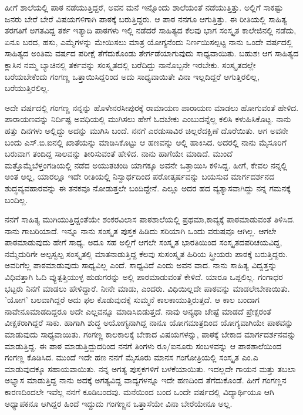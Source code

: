 {ಹೀಗೆ ಶಾಲೆಯಲ್ಲಿ ಪಾಠ ನಡೆಯುತ್ತಿದ್ದರೆ, ಅವನ ಮನೆ ಇನ್ನೊಂದು \hbox{ಶಾಲೆಯಂತೆ} ನಡೆಯುತ್ತಿತ್ತು. ಅಲ್ಲಿಗೆ ಸಾಕಷ್ಟು ಜನರು ಬೇರೆ ಬೇರೆ ವಿಷಯಗಳಿಗಾಗಿ ಪಾಠಕ್ಕೆ ಬರುತ್ತಿದ್ದರು. ಆ ಪಾಠ ನನಗೂ ಆಗುತ್ತಿತ್ತು.  ಈ ರೀತಿಯಲ್ಲಿ ಸಾಹಿತ್ಯ ತರಗತಿಗೆ  ಅಗತವಿದ್ದ ತರ್ಕ ಇತ್ಯಾದಿ ಪಾಠಗಳು ಇಲ್ಲಿ ನಡೆದರೆ ಸಾಹಿತ್ಯದ ಕೆಲವು ಭಾಗ ಸಂಸ್ಕೃತ ಕಾಲೇಜಿನಲ್ಲಿ  ನಡೆದು,  ಏನೂ ಬರದ, ಹಸು, ಎಮ್ಮೆಗಳನ್ನು ಮೇಯಿಸಲು ಮಾತ್ರ ಯೋಗ್ಯನೆಂದು ನಿರ್ಣಯಿಸಲ್ಪಟ್ಟ ನಾನು ಒಂದೇ ವರ್ಷದಲ್ಲಿ ಸಾಹಿತ್ಯದ ಅಂತಿಮ ವರ್ಷದ ಪರೀಕ್ಷೆ ತೆಗೆದುಕೊಂಡು ತೇರ್ಗಡೆಯಾಗುವುದು ಸಾಧ್ಯವಾಯಿತು. ಬಹುಶಃ ಆಗ ಸಾಹಿತ್ಯದ ಕ್ಲಾಸಿನ ನಮ್ಮ ಬ್ಯಾಚಿನಲ್ಲಿ ತರ್ಕವನ್ನು ಸಂಸ್ಕೃತದಲ್ಲಿ ಬರೆದಿದ್ದು ನಾನೊಬ್ಬನೇ ಇರಬೇಕು. ಸಂಸ್ಕೃತದಲ್ಲೇ ಬರೆಯಬೇಕೆಂದು ಗಂಗಣ್ಣ ಒತ್ತಾಯಿಸಿದ್ದರಿಂದ ಅದು ಸಾಧ್ಯವಾಯಿತೇ ವಿನಾ ಇಲ್ಲದಿದ್ದರೆ ಆಗುತ್ತಿರಲಿಲ್ಲ, ಬರೆಯುತ್ತಿರಲಿಲ್ಲ.

ಅದೇ ವರ್ಷದಲ್ಲಿ ಗಂಗಣ್ಣ ನನ್ನನ್ನು ಹೊಳೇನರಸೀಪುರಕ್ಕೆ ರಾಮಾಯಣ ಪಾರಾಯಣ ಮಾಡಲು ಹೋಗುವಂತೆ ಹೇಳಿದ. ಪಾರಾಯಣವನ್ನು ನಿರ್ದಿಷ್ಟ ಅವಧಿಯಲ್ಲಿ ಮುಗಿಸಲು ಹೇಗೆ ಓದಬೇಕು ಎಂಬುದನ್ನೆಲ್ಲ ಕಲಿಸಿ ಕಳುಹಿಸಿಕೊಟ್ಟ. ನಾನು ಹತ್ತು ದಿನಗಳು ಅಲ್ಲಿದ್ದು ಅದನ್ನು ಮುಗಿಸಿ ಬಂದೆ. ನನಗೆ ಎರಡುಸಾವಿರ ಚಿಲ್ಲರೆ\break ದಕ್ಷಿಣೆ ದೊರೆಯಿತು. ಆಗ ಅವನೇ ಬಂದು ಎಸ್.ಬಿ.ಐನಲ್ಲಿ ಖಾತೆಯನ್ನು ಮಾಡಿಸಿ\-ಕೊಟ್ಟು ಆ ಹಣವನ್ನು ಅಲ್ಲಿ ಹಾಕಿಸಿದ. ಅದರಲ್ಲಿ ನಾನು ಮೈಸೂರಿಗೆ ಬರುವಾಗ ತಂದಿದ್ದ ಸಾಲವನ್ನು ತೀರಿಸುವಂತೆ ಹೇಳಿದ. ನಾನು ಹಾಗೆಯೇ ಮಾಡಿದೆ. ಮುಂದೆ ಮತ್ತೊಮ್ಮೆ\break ಬೆಳ್ತಂಗಡಿಯಲ್ಲಿ ನಡೆದ ಅಯುತಚಂಡಿ ಯಾಗಕ್ಕೂ ಅವನೇ ಒತ್ತಾಯಿಸಿ ಕಳಿಸಿದ್ದ. ಹೀಗೆ, ಕೇವಲ ನನ್ನಲ್ಲಿ ಅಂತ ಅಲ್ಲ, ಯಾರಲ್ಲೂ ಇದೇ ರೀತಿಯಲ್ಲಿ ನಿಸ್ವಾರ್ಥದಿಂದ ಪರೋತ್ಕರ್ಷವನ್ನು ಬಯಸುವ ಮಾರ್ಗದರ್ಶನದ  ಶುದ್ಧವ್ಯವಹಾರವನ್ನು ಈ ತನಕವೂ ನೋಡುತ್ತಲೇ ಬಂದಿದ್ದೇನೆ. ಎಲ್ಲೂ ಅದರ ಹದ ವ್ಯತ್ಯಾಸವಾಗಿದ್ದು ನನ್ನ ಗಮನಕ್ಕೆ ಬಂದಿಲ್ಲ.

ನನಗೆ ಸಾಹಿತ್ಯ  ಮುಗಿಯುತ್ತಿದ್ದಂತೆಯೇ ಶಂಕರವಿಲಾಸ ಪಾಠಶಾಲೆಯಲ್ಲಿ ಪ್ರಥಮಾ,\break ಕಾವ್ಯಕ್ಕೆ ಪಾಠಮಾಡುವಂತೆ ತಿಳಿಸಿದ. ನಾನು ಗಾಬರಿಯಾದೆ. ಇನ್ನೂ ನಾನು ಸಂಸ್ಕೃತ ಪುಸ್ತಕ ಹಿಡಿದು ಸರಿಯಾಗಿ ಒಂದು ವರುಷವೂ ಆಗಿಲ್ಲ. ಆಗಲೇ ಪಾಠಮಾಡುವುದು ಹೇಗೆ ಸಾಧ್ಯ. ಅದೂ ಸಹ ಅಲ್ಲಿಗೆ ಆಗಲೇ ಸಂಸ್ಕೃತ ಭಾರತಿಯಿಂದ ಸಂಸ್ಕೃತದ\break ಪರಿಚಯವಿದ್ದ, ನಮ್ಮೆದುರಿಗೇ ಅಲ್ಪಸ್ವಲ್ಪ ಸಂಸ್ಕೃತಲ್ಲಿ ಮಾತನಾಡುತ್ತಿದ್ದ ಕೆಲವು \hbox{ಸುಸಂಸ್ಕೃತ} ಹಿರಿಯ ಸ್ತ್ರೀಯರು ಪಾಠಕ್ಕೆ ಬರುತ್ತಿದ್ದರು. ಅವರಿಗೆಲ್ಲ ಪಾಠಮಾಡುವುದು ಸಾಧ್ಯವಿಲ್ಲ ಎಂದೆ. ಸಾಧ್ಯವಿದೆ ಎಂದು ಅವನ ವಾದ. ನಾನು ಸಾಹಿತ್ಯ ವಿದ್ವತ್ತನ್ನು ವಿಧಿವತ್ತಾಗಿ ಓದಿ ವ್ಯುತ್ಪತ್ತಿಯುಳ್ಳ ಹುಡುಗರನ್ನು ಅಲ್ಲಿ ಪಾಠಮಾಡುವಂತೆ ಕೇಳಿದೆ. ಯಾರೂ ಒಪ್ಪಲಿಲ್ಲ. ಗಂಗಾಧರ ಭಟ್ಟರು ನಿನಗೆ ಮಾಡಲು ಹೇಳಿದ್ದಾರೆ. ನೀನೇ ಮಾಡು, ಎಂದರು. ವಿಧಿಯಿಲ್ಲದೇ ಪಾಠವನ್ನು ಮಾಡಲೇಬೇಕಾಯಿತು. 'ಯೋಗ' ಬಲವಾಗಿದ್ದರೆ ಅದು ಫಲ ಕೊಡುವುದಕ್ಕೆ ಸುಮ್ಮನೆ ಕಾಲಕಾಯುತ್ತಿರುತ್ತದೆ. ಆ ಕಾಲ ಬಂದಾಗ ನಾವೇನೂ\break ಮಾಡದಿದ್ದರೂ ಅದೇ ಎಲ್ಲವನ್ನೂ ಮಾಡಿಸಿಬಿಡುತ್ತದೆ. ನಾವು ಅನ್ಯಥಾ ಚೇಷ್ಟೆ ಮಾಡದೆ ಪ್ರೇಕ್ಷರಂತೆ ವೀಕ್ಷಕರಾಗಿದ್ದರೆ ಸಾಕು. ಹಾಗಾಗಿ ಶುದ್ಧ ಅಯೋಗ್ಯನಾಗಿದ್ದ ನಾನೂ ಯೋಗಮಾತ್ರದಿಂದ ಯೋಗ್ಯವಾಗಿಯೇ ಪಾಠವನ್ನು  ಮಾಡುವುದು ಸಾಧ್ಯವಾಯಿತು. ಗಂಗಣ್ಣ ಕಾಲಕಾಲಕ್ಕೆ ಬೇಕಾದ ವಿಷಯಗಳನ್ನು, ಪಾಠಕ್ಕೆ ಬೇಕಾದ ಮಾರ್ಗದರ್ಶನವನ್ನು ಮಾಡುತ್ತಿದ್ದ. ಈ ಪಾಠ ಮಾಡುತ್ತಿದ್ದುದರಿಂದ ನನಗೆ ತಿಂಗಳು ರೂ/ಐನೂರು  ಸಂಬಳವನ್ನು ಆ ಪಾಠಶಾಲೆಯಿಂದ ಗಂಗಣ್ಣ ಕೊಡಿಸಿದ. ಮುಂದೆ ಇದೇ ಹಣ ನನಗೆ ಮೈಸೂರು ಮಾನಸ ಗಂಗೋತ್ರಿಯಲ್ಲಿ  ಸಂಸ್ಕೃತ ಎಂ.ಎ ಮಾಡುವುದಕ್ಕೂ ಸಹಾಯವಾಯಿತು. ನನ್ನ ಅಗತ್ಯ ಪುಸ್ತಕಗಳಿಗೆ ಬಳಕೆಯಾಯಿತು. ಇದಲ್ಲದೇ ಗಾಯನ ಮತ್ತು ತಬಲಾ ಅಭ್ಯಾಸ ಮಾಡುತ್ತಿದ್ದ ನಾನು ಅದಕ್ಕೆ ಅಗತ್ಯವಿದ್ದ ವಾದ್ಯಗಳನ್ನೂ ಇದೇ ಹಣದಿಂದ ತೆಗೆದು\-ಕೊಂಡೆ. ಹೀಗೆ ಗಂಗಣ್ಣನ ಕಾರಣದಿಂದಲೇ ಇವೆಲ್ಲ ನನಗೆ  ಕೂಡಿಬಂದವು. ಮನೆಯಿಂದ ಬಂದ ಒಂದೇ ವರ್ಷದಲ್ಲಿ ವಿದ್ಯಾರ್ಥಿಯೂ ಆಗಿ ಅಧ್ಯಾಪಕನೂ ಆಗಿದ್ದರ ಹಿಂದೆ ಇದ್ದುದು ಗಂಗಣ್ಣನ ಒತ್ತಾಸೆಯೇ ವಿನಾ ಬೇರೆಯೇನೂ ಅಲ್ಲ. 

}
